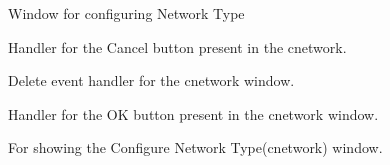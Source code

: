 \documentclass[letterpaper,10pt,english]{sphinxmanual}
\begin{document}
\begin{fulllineitems}
\label{index:cnetwork.cnetwork}
Window for configuring Network Type


\begin{fulllineitems}
\label{index:cnetwork.cnetwork.on_cancel}
Handler for the Cancel button present in the cnetwork.

\end{fulllineitems}



\begin{fulllineitems}
\label{index:cnetwork.cnetwork.on_network_conf_delete_event}
Delete event handler for the cnetwork window.

\end{fulllineitems}



\begin{fulllineitems}
\label{index:cnetwork.cnetwork.on_ok}
Handler for the OK button present in the cnetwork window.

\end{fulllineitems}



\begin{fulllineitems}
\label{index:cnetwork.cnetwork.show}
For showing the Configure Network Type(cnetwork) window.

\end{fulllineitems}


\end{fulllineitems}

\label{index:module-qprop}
\end{document}
